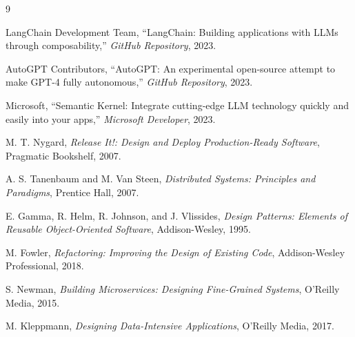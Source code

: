 \documentclass[conference]{IEEEtran}
\begin{document}
\begin{thebibliography}{9}

LangChain Development Team,
``LangChain: Building applications with LLMs through composability,''
\textit{GitHub Repository}, 2023.

AutoGPT Contributors,
``AutoGPT: An experimental open-source attempt to make GPT-4 fully autonomous,''
\textit{GitHub Repository}, 2023.

Microsoft,
``Semantic Kernel: Integrate cutting-edge LLM technology quickly and easily into your apps,''
\textit{Microsoft Developer}, 2023.

M. T. Nygard,
\textit{Release It!: Design and Deploy Production-Ready Software},
Pragmatic Bookshelf, 2007.

A. S. Tanenbaum and M. Van Steen,
\textit{Distributed Systems: Principles and Paradigms},
Prentice Hall, 2007.

E. Gamma, R. Helm, R. Johnson, and J. Vlissides,
\textit{Design Patterns: Elements of Reusable Object-Oriented Software},
Addison-Wesley, 1995.

M. Fowler,
\textit{Refactoring: Improving the Design of Existing Code},
Addison-Wesley Professional, 2018.

S. Newman,
\textit{Building Microservices: Designing Fine-Grained Systems},
O'Reilly Media, 2015.

M. Kleppmann,
\textit{Designing Data-Intensive Applications},
O'Reilly Media, 2017.

\end{thebibliography}
\end{document}

